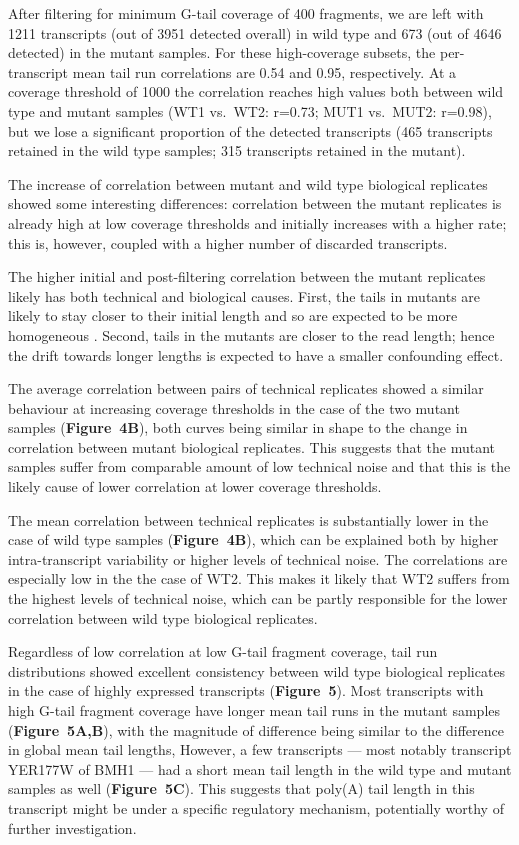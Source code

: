 \documentclass[10pt]{article}
\begin{document}
After filtering for minimum G-tail coverage of 400 fragments, we are left with 1211 transcripts (out of 3951 detected overall) in wild type and 673 (out of 4646 detected) in the mutant samples. For these high-coverage subsets, the per-transcript mean tail run correlations are 0.54 and 0.95, respectively. At a coverage threshold of 1000 the correlation reaches high values both between wild type and mutant samples (WT1 vs.\ WT2: r=0.73; MUT1 vs.\ MUT2: r=0.98), but we lose a significant proportion of the detected transcripts (465 transcripts retained in the wild type samples; 315 transcripts retained in the mutant).

The increase of correlation between mutant and wild type biological replicates showed some interesting differences: correlation between the mutant replicates is already high at low coverage thresholds and initially increases with a higher rate; this is, however, coupled with a higher number of discarded transcripts. 

The higher initial and post-filtering correlation between the mutant replicates likely has both technical and biological causes. First, the tails in mutants are likely to stay closer to their initial length and so are expected to be more homogeneous \cite{beilharz07,traven05}. Second, tails in the mutants are closer to the read length; hence the drift towards longer lengths is expected to have a smaller confounding effect.

The average correlation between pairs of technical replicates showed a similar behaviour at increasing coverage thresholds in the case of the two mutant samples (\textbf{Figure~4B}), both curves being similar in shape to the change in correlation between mutant biological replicates. This suggests that the mutant samples suffer from comparable amount of low technical noise and that this is the likely cause of lower correlation at lower coverage thresholds.

The mean correlation between technical replicates is substantially lower in the case of wild type samples (\textbf{Figure~4B}), which can be explained both by higher intra-transcript variability or higher levels of technical noise. The correlations are especially low in the the case of WT2. This makes it likely that WT2 suffers from the highest levels of technical noise, which can be partly responsible for the lower correlation between wild type biological replicates.

Regardless of low correlation at low G-tail fragment coverage, tail run distributions showed excellent consistency between wild type biological replicates in the case of highly expressed transcripts (\textbf{Figure~5}). Most transcripts with high G-tail fragment coverage have longer mean tail runs in the mutant samples (\textbf{Figure~5A,B}), with the magnitude of difference being similar to the difference in global mean tail lengths, However, a few transcripts --- most notably transcript YER177W of BMH1 --- had a short mean tail length in the wild type and mutant samples as well (\textbf{Figure~5C}). This suggests that poly(A) tail length in this transcript might be under a specific regulatory mechanism, potentially worthy of further investigation.
\end{document}
